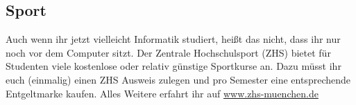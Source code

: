 \subsection{Sport}
Auch wenn ihr jetzt vielleicht Informatik studiert, heißt das nicht, dass 
ihr nur noch vor dem Computer sitzt. 
Der Zentrale Hochschulsport (ZHS) bietet für Studenten 
viele kostenlose oder relativ günstige Sportkurse an. 
Dazu müsst ihr euch (einmalig) einen ZHS Ausweis 
zulegen und pro Semester eine entsprechende 
Entgeltmarke kaufen. 
Alles Weitere erfahrt ihr auf 
\url{www.zhs-muenchen.de}